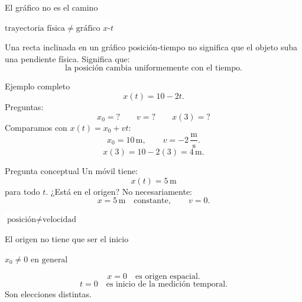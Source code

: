 \documentclass[aspectratio=169,11pt]{beamer}
\newcommand{\caja}[1]{%
  \begin{center}
  \setlength{\fboxsep}{9pt}
  \colorbox{white}{\(\displaystyle \boxed{#1}\)}
  \end{center}
}
\begin{document}
\begin{frame}{El gráfico no es el camino}
  \caja{\text{trayectoria física}\neq \text{gráfico }x\text{-}t}
  \vspace{0.5em}
  Una recta inclinada en un gráfico posición-tiempo no significa que el objeto suba una pendiente física.
  \vspace{0.6em}
  Significa que:
  \[
    \text{la posición cambia uniformemente con el tiempo}.
  \]
\end{frame}

\begin{frame}{Ejemplo completo}
  \[
    x(t)=10-2t.
  \]
  Preguntas:
  \[
    x_0=?\qquad v=?\qquad x(3)=?
  \]
  Comparamos con \(x(t)=x_0+vt\):
  \[
    x_0=10\,\mathrm{m},
    \qquad
    v=-2\,\frac{\mathrm{m}}{\mathrm{s}}.
  \]
  \[
    x(3)=10-2(3)=4\,\mathrm{m}.
  \]
\end{frame}

\begin{frame}{Pregunta conceptual}
  Un móvil tiene:
  \[
    x(t)=5\,\mathrm{m}
  \]
  para todo \(t\).
  \vspace{0.5em}
  ¿Está en el origen?
  \vspace{0.5em}
  No necesariamente:
  \[
    x=5\,\mathrm{m}\quad\text{constante},
    \qquad
    v=0.
  \]
  \caja{\text{posición}\neq \text{velocidad}}
\end{frame}

\begin{frame}{El origen no tiene que ser el inicio}
  \caja{x_0\neq 0\text{ en general}}
  \[
    x=0
    \quad\text{es origen espacial.}
  \]
  \[
    t=0
    \quad\text{es inicio de la medición temporal.}
  \]
  \vspace{0.5em}
  Son elecciones distintas.
  \begin{center}
  \end{center}
\end{frame}
\end{document}
